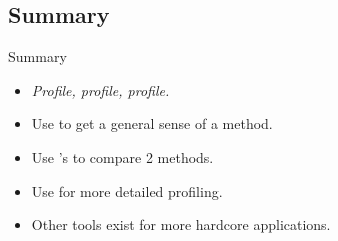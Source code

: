 \subsection{Summary}

\begin{frame}
  \begin{block}{Summary}
    \begin{itemize}
      \item \emph{Profile, profile, profile.}
      \item Use  to get a general sense of a method.
      \item Use 's  to compare 2 methods.
      \item Use  for more detailed profiling.
      \item Other tools exist for more hardcore applications.
    \end{itemize}
  \end{block}
\end{frame}